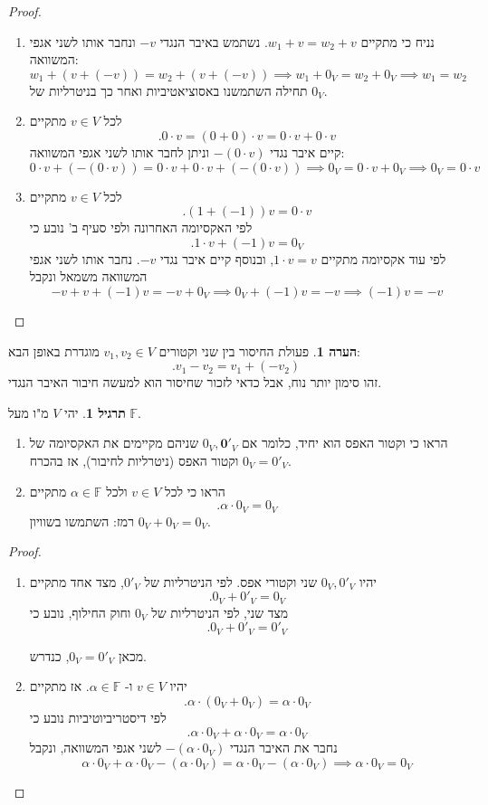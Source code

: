 \documentclass[12pt]{report}
\theoremstyle{plain}
\theoremstyle{definition}
\newtheorem{exercise}{תרגיל}[chapter]
\newtheorem{remark}{הערה}[chapter]
\newcommand{\F}{\mathbb{F}}
\newcommand{\0}{\mathbf{0}}
\begin{document}
\begin{proof}\
\begin{enumerate}[label=\alph*.]
\item
נניח כי מתקיים
$w_1+v=w_2+v$.
נשתמש באיבר הנגדי
$-v$
ונחבר אותו לשני אגפי המשוואה:
$$
w_1+(v+(-v))=w_2+(v+(-v)) \implies w_1+0_V=w_2+0_V \implies w_1=w_2
$$
תחילה השתמשנו באסוציאטיביות ואחר כך בניטרליות של
$0_V$.


\item
לכל 
$v\in V$
מתקיים
$$
.0\cdot v=(0+0)\cdot v=0\cdot v+0\cdot v
$$
קיים איבר נגדי 
$-(0\cdot v)$
וניתן לחבר אותו לשני אגפי המשוואה:
$$
0\cdot v+(-(0\cdot v))=0\cdot v+0\cdot v+(-(0\cdot v)) \implies 0_V=0\cdot v+0_V \implies 0_V=0\cdot v
$$


\item 
לכל
$v\in V$
מתקיים
$$
.(1+(-1))v=0\cdot v
$$
לפי האקסיומה האחרונה ולפי סעיף ב' נובע כי
$$
.1\cdot v+(-1)v=0_V
$$
לפי עוד אקסיומה מתקיים
$1\cdot v=v$,
ובנוסף קיים איבר נגדי
$-v$. 
נחבר אותו לשני אגפי המשוואה משמאל ונקבל
$$
-v+v+(-1)v=-v+0_V \implies 0_V+(-1)v=-v \implies (-1)v=-v
$$


\end{enumerate}
\end{proof}

\begin{remark}
פעולת החיסור בין שני וקטורים
$v_1,v_2\in V$
מוגדרת באופן הבא:
$$
.v_1-v_2=v_1+(-v_2)
$$
זהו סימון יותר נוח, אבל כדאי לזכור שחיסור הוא למעשה חיבור האיבר הנגדי.
\end{remark}

\begin{exercise}
יהי 
$V$
מ"ו מעל
$\F$.
\begin{enumerate}[label=\alph*.]
\item 
הראו כי וקטור האפס הוא יחיד, כלומר אם
$0_V,\0'_V$
שניהם מקיימים את האקסיומה של וקטור האפס (ניטרליות לחיבור), אז בהכרח
$0_V=0'_V$.


\item
הראו כי לכל
$v\in V$
ולכל
$\alpha\in\F$
מתקיים
$$
.\alpha\cdot0_V=0_V
$$
רמז: השתמשו בשוויון
$0_V+0_V=0_V$.


\end{enumerate}
\end{exercise}

\begin{proof}
\begin{enumerate}[label=\alph*.]
\item 
יהיו
$0_V,0'_V$
שני וקטורי אפס. לפי הניטרליות של 
$0'_V$,
מצד אחד מתקיים
$$
.0_V+0'_V=0_V
$$
מצד שני, לפי הניטרליות של
$0_V$
וחוק החילוף, נובע כי
$$
.0_V+0'_V=0'_V
$$

מכאן
$0_V=0'_V$,
כנדרש.


\item
יהיו
$v\in V$
ו-
$\alpha\in \F$.
אז מתקיים
$$
.\alpha\cdot(0_V+0_V)=\alpha\cdot 0_V
$$
לפי דיסטריביוטיביות נובע כי
$$
.\alpha\cdot 0_V+\alpha\cdot 0_V=\alpha\cdot 0_V
$$
נחבר את האיבר הנגדי
$-(\alpha\cdot 0_V)$
לשני אגפי המשוואה, ונקבל
$$
\alpha\cdot 0_V+\alpha\cdot 0_V-(\alpha\cdot 0_V)=\alpha\cdot 0_V-(\alpha\cdot 0_V) \implies \alpha\cdot 0_V=0_V
$$


\end{enumerate}
\end{proof}
\end{document}
